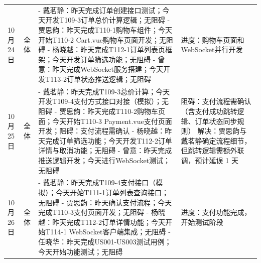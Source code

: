\begin{levellist}
\begin{longtable}{>{\centering\arraybackslash}m{1cm} >{\centering\arraybackslash}m{1cm} >{\centering\arraybackslash}m{8.5cm} >{\centering\arraybackslash}m{3cm}}
        10月24日                                              & 全体                                                                               & - 戴茗静：昨天完成订单创建接口测试；今天开发T109-3订单总价计算逻辑；无阻碍 \newline
        - 贾思韵：昨天完成T110-1购物车组件；今天开始T110-2 Cart.vue购物车页面开发；无阻碍 \newline
        - 杨晓越：昨天完成T112-1订单列表页框架；今天开发订单筛选功能；无阻碍 \newline
        - 曾意：昨天完成WebSocket服务搭建；今天开发T113-2订单状态推送逻辑；无阻碍       & 进度：购物车页面和WebSocket并行开发                                                                                                                                                                     \\
        10月25日                                              & 全体                                                                               & - 戴茗静：昨天完成T109-3总价计算；今天开发T109-4支付方式接口对接（模拟）；无阻碍 \newline
        - 贾思韵：昨天完成T110-2购物车页面；今天开始T110-3 Payment.vue支付页面开发；阻碍：支付流程需确认 \newline
        - 杨晓越：昨天完成订单筛选功能；今天开发T112-2订单详情与取消功能；无阻碍 \newline
        - 曾意：昨天完成推送逻辑开发；今天进行WebSocket测试；无阻碍                 & 阻碍：支付流程需确认（含支付成功跳转逻辑、订单状态同步规则）  \newline
        解决：贾思韵与戴茗静确定流程细节，但跳转逻辑需额外联调，预计延误 1 天                                                                                                                                                                                                             \\
        10月26日                                              & 全体                                                                               & - 戴茗静：昨天完成T109-4支付接口（模拟）；今天开始T111-1订单列表查询接口；无阻碍 \newline
        - 贾思韵：昨天确认支付流程；今天完成T110-3支付页面开发；无阻碍 \newline
        - 杨晓越：昨天完成T112-2订单详情功能；今天开始T114-1 WebSocket客户端集成；无阻碍 \newline
        - 任晓华：昨天完成US001-US003测试用例；今天开始功能测试；无阻碍              & 进度：支付功能完成，开始测试阶段                                                                                                                                                                           \\

\end{longtable}
\end{levellist}
